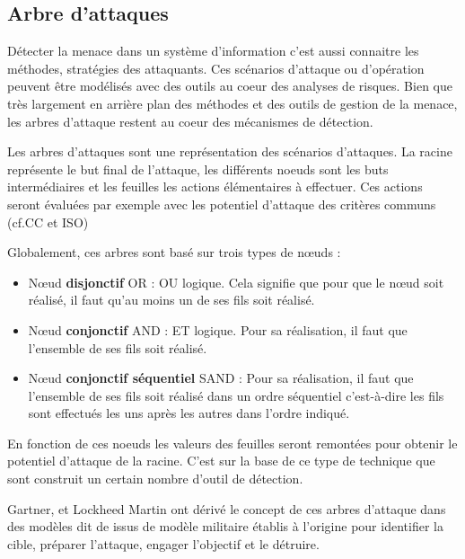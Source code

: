 \subsection{Arbre d'attaques} \label{ref_arbre_attaques}


Détecter la menace dans un système d'information c'est aussi connaitre les méthodes, stratégies des attaquants. Ces scénarios d'attaque ou d'opération peuvent être modélisés avec des outils au coeur des analyses de risques. Bien que très largement en arrière plan des méthodes et des outils de gestion de la menace, les arbres d'attaque restent au coeur des mécanismes de détection.

Les arbres d'attaques sont une représentation des scénarios d'attaques. La racine représente le but final de l'attaque, les différents noeuds sont les buts intermédiaires et les feuilles les actions élémentaires à effectuer. Ces actions seront évaluées par exemple avec les potentiel d'attaque des critères communs (cf.CC et ISO)

Globalement, ces arbres sont basé sur trois types de nœuds :

\begin{itemize}
  \item Nœud \textbf{disjonctif} OR : OU logique. Cela signifie que pour que le nœud soit réalisé, il faut qu’au moins un de ses fils soit réalisé.
  \item Nœud \textbf{conjonctif} AND : ET logique. Pour sa réalisation, il faut que l’ensemble de ses fils soit réalisé.
  \item Nœud \textbf{conjonctif séquentiel }SAND : Pour sa réalisation, il faut que l'ensemble de ses fils soit réalisé dans un ordre séquentiel c'est-à-dire les fils sont effectués les uns après les autres dans l’ordre indiqué.
\end{itemize}

En fonction de ces noeuds les valeurs des feuilles seront remontées pour obtenir le potentiel d'attaque de la racine.
C'est sur la base de ce type de technique que sont construit un certain nombre d'outil de détection.
 

Gartner, et Lockheed Martin ont dérivé le concept de ces arbres d'attaque dans des modèles dit de  issus de modèle militaire établis à l’origine pour identifier la cible, préparer l’attaque, engager l’objectif et le détruire.

